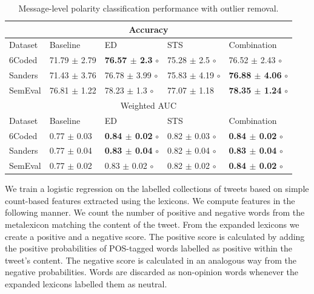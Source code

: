 \documentclass{sig-alternate}
\begin{document}
\begin{table}[htbp]
\begin{center}
\begin{tabular}{l|l|l|l|l}
\hline
\hline
\multicolumn{5}{c}{Accuracy } \\ \hline \hline
Dataset & Baseline & ED & STS &  Combination \\ \hline
6Coded & 71.79 $\pm$ 2.79 & \textbf{ 76.57 $\pm$ 2.3} $\circ$ & 75.28 $\pm$ 2.5 $\circ$ & 76.52 $\pm$ 2.43 $\circ$ \\ 
Sanders & 71.43 $\pm$ 3.76 & 76.78 $\pm$ 3.99 $\circ$ & 75.83 $\pm$ 4.19 $\circ$  & \textbf{76.88 $\pm$ 4.06} $\circ$ \\ 
SemEval & 76.81 $\pm$ 1.22 & 78.23 $\pm$ 1.3 $\circ$ & 77.07 $\pm$ 1.18 & \textbf{78.35 $\pm$ 1.24} $\circ$ \\ \hline \hline
\multicolumn{ 5}{c}{Weighted AUC } \\ \hline \hline
Dataset & Baseline & ED & STS & Combination \\ \hline 
6Coded & 0.77 $\pm$ 0.03 & \textbf{0.84 $\pm$ 0.02} $\circ$ & 0.82 $\pm$ 0.03 $\circ$ &  \textbf{0.84 $\pm$ 0.02} $\circ$ \\ 
Sanders & 0.77 $\pm$ 0.04 & \textbf{0.83 $\pm$ 0.04} $\circ$ & 0.82 $\pm$ 0.04 $\circ$ & \textbf{0.83 $\pm$ 0.04} $\circ$ \\ 
SemEval & 0.77 $\pm$ 0.02 & 0.83 $\pm$ 0.02 $\circ$ & 0.82 $\pm$ 0.02 $\circ$  & \textbf{0.84 $\pm$ 0.02} $\circ$ \\ \hline
\end{tabular}
\caption{Message-level polarity classification performance with outlier removal.}
\label{tab:messclassout}
\end{center}
\end{table}



We train a logistic regression on the labelled collections of tweets  based on simple count-based features extracted using the lexicons. We compute features in the following manner. We count the number of positive and negative words from the metalexicon  matching the content of the tweet. From the expanded lexicons we create a positive and a negative score. The positive score is calculated by adding the positive probabilities of POS-tagged words labelled as positive within the tweet's content. The negative score is calculated in an analogous way from the negative probabilities. Words are discarded as non-opinion words whenever the expanded lexicons labelled them as neutral.
\end{document}
